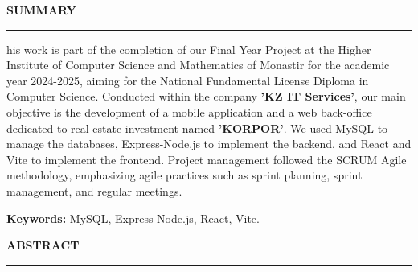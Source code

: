 \thispagestyle{empty} %

\begin{center}
{\color{primary}\Large\textbf{\MakeUppercase{Summary}}}
\end{center}
\vspace{0.1cm}
\begin{center}
\rule{0.6\textwidth}{1pt}
\end{center}
\vspace{0.5cm}

\noindent {}his work is part of the completion of our Final Year Project at the Higher Institute of Computer Science and Mathematics of Monastir for the academic year 2024-2025, aiming for the National Fundamental License Diploma in Computer Science. Conducted within the company \textbf{\textcolor{primary}{'KZ IT Services'}}, our main objective is the development of a mobile application and a web back-office dedicated to real estate investment named \textbf{\textcolor{primary}{'KORPOR'}}. We used MySQL to manage the databases, Express-Node.js to implement the backend, and React and Vite to implement the frontend. Project management followed the SCRUM Agile methodology, emphasizing agile practices such as sprint planning, sprint management, and regular meetings.

\vspace{0.3cm}
\begin{tcolorbox}[
    colback=background,
    colframe=primary,
    arc=1mm,
    boxrule=0.5pt,
    left=8pt,
    right=8pt,
    top=4pt,
    bottom=4pt,
    width=\textwidth
]
\textbf{Keywords:} MySQL, Express-Node.js, React, Vite.
\end{tcolorbox}

\vspace{2cm} %



\begin{center}
{\color{primary}\Large\textbf{\MakeUppercase{Abstract}}}
\end{center}
\vspace{0.1cm}
\begin{center}
\rule{0.6\textwidth}{1pt}
\end{center}
\vspace{0.5cm}

